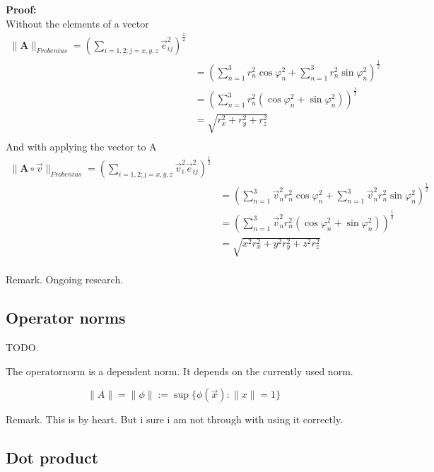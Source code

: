 \documentclass[a4paper]{article}
\begin{document}
\textbf{Proof:}\\
Without the elements of a vector 
\begin{displaymath}
\begin{align}
\|\boldsymbol{A}\|_{Frobenius} = (\sum_{i=1,2;j=x,y,z}\vec{e}_{ij}^{2})^{\frac{1}{2}} \\
&= (\sum_{n=1}^{3}r_{n}^{2}\cos\varphi_n^{2} + \sum_{n=1}^{3}r_{n}^{2}\sin\varphi_n^{2})^{\frac{1}{2}}\\
&= (\sum_{n=1}^{3}r_{n}^{2}(\cos\varphi_n^{2} + \sin\varphi_n^{2}))^{\frac{1}{2}}\\
&= \sqrt{r_{x}^{2}+r_{y}^{2}+r_{z}^{2}}\\
\end{align}
\end{displaymath}
And with applying the vector to A
\begin{displaymath}
\begin{align}
\|\boldsymbol{A}\circ\vec{v}\|_{Frobenius} = (\sum_{i=1,2;j=x,y,z}\vec{v}_{i}^{2}\vec{e}_{ij}^{2})^{\frac{1}{2}} \\
&= (\sum_{n=1}^{3}\vec{v}_{n}^{2}r_{n}^{2}\cos\varphi_n^{2} + \sum_{n=1}^{3}\vec{v}_{n}^{2}r_{n}^{2}\sin\varphi_n^{2})^{\frac{1}{2}}\\
&= (\sum_{n=1}^{3}\vec{v}_{n}^{2}r_{n}^{2}(\cos\varphi_n^{2} + \sin\varphi_n^{2}))^{\frac{1}{2}}\\
&= \sqrt{x^{2}r_{x}^{2}+y^{2}r_{y}^{2}+z^{2}r_{z}^{2}}\\
\end{align}
\end{displaymath}

Remark. Ongoing research.



\subsection{Operator norms}

TODO.

The operatornorm is a dependent norm. It depends on the currently used norm. 

\begin{displaymath}
\|A\| = \|\phi\| := \sup\{ \phi(\vec{x}) : \|x\|=1 \}
\end{displaymath}

Remark. This is by heart. But i sure i am not through with using it correctly.

\subsection{Dot product}
\end{document}
